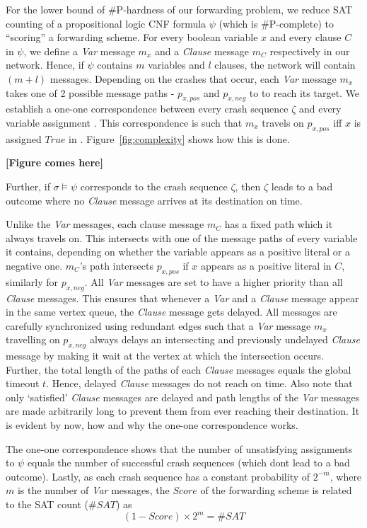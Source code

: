 \documentclass[11pt,eepic]{article}
\begin{document}
	For the lower bound of \#P-hardness of our forwarding problem, we reduce SAT counting of a propositional logic CNF formula $\psi$ (which is \#P-complete) to ``scoring'' a forwarding scheme. For every boolean variable $x$ and every clause $C$ in $\psi$, we define a {\it Var} message $m_x$ and a {\it Clause} message $m_C$ respectively in our network. Hence, if $\psi$ contains $m$ variables and $l$ clauses, the network will contain $(m+l)$ messages. Depending on the crashes that occur, each {\it Var} message $m_x$ takes one of 2 possible message paths - $p_{x,pos}$ and $p_{x,neg}$ to to reach its target. We establish a one-one correspondence between every crash sequence $\zeta$ and every variable assignment \sigma. This correspondence is such that $m_x$ travels on $p_{x,pos}$ iff $x$ is assigned $True$ in \sigma. Figure~\ref{fig:complexity} shows how this is done.

	{\bf [Figure comes here]}

	Further, if $\sigma \models \psi$ corresponds to the crash sequence $\zeta$, then $\zeta$ leads to a {bad} outcome where no {\it Clause} message arrives at its destination on time.

	Unlike the {\it Var} messages, each clause message $m_C$ has a fixed path which it always travels on. This intersects with one of the message paths of every variable it contains, depending on whether the variable appears as a positive literal or a negative one. $m_C$'s path intersects $p_{x,pos}$ if $x$ appears as a positive literal in $C$, similarly for $p_{x,neg}$. All {\it Var} messages are set to have a higher priority than all {\it Clause} messages. This ensures that whenever a {\it Var} and a {\it Clause} message appear in the same vertex queue, the {\it Clause} message gets delayed. All messages are carefully synchronized using redundant edges such that a {\it Var} message $m_x$ travelling on $p_{x,neg}$ always delays an intersecting and previously undelayed {\it Clause} message by making it wait at the vertex at which the intersection occurs. Further, the total length of the paths of each {\it Clause} messages equals the global timeout $t$. Hence, delayed {\it Clause} messages do not reach on time. Also note that only `satisfied' {\it Clause} messages are delayed and path lengths of the {\it Var} messages are made arbitrarily long to prevent them from ever reaching their destination. It is evident by now, how and why the one-one correspondence works.

	The one-one correspondence shows that the number of unsatisfying assignments to $\psi$ equals the number of successful crash sequences (which dont lead to a bad outcome). Lastly, as each crash sequence has a constant probability of $2^{-m}$, where $m$ is the number of {\it Var} messages, the $Score$ of the forwarding scheme is related to the SAT count ($\#SAT$) as $$(1-Score)\times 2^m = \# SAT$$
\end{document}
